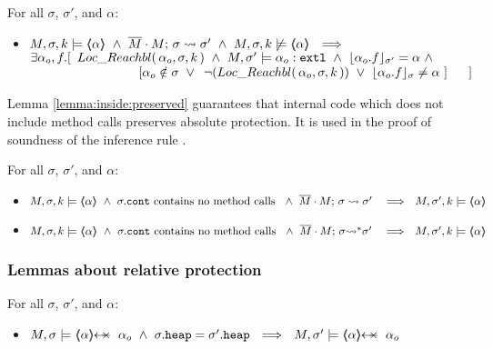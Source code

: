   
 
   {
 \begin{lemma} For all $\sigma$, $\sigma'$, and $\alpha$:
 \label{lemma:notInside:implies}
\begin{itemize}
\item
$ \satDAssertFrom M  {\sigma} k   {\inside{\alpha}}  \ \wedge \ \leadstoBounded  {\Mtwo\cdot M}  {\sigma}  {\sigma'}\ \wedge \  \notSatDAssertFrom M  {\sigma} k   {\inside{\alpha}}
 \ \ \Longrightarrow\ \ $\\
 $\exists \alpha_o,f.[\  \LRelevantK {\alpha_o} {\sigma} {k} \ \wedge \ M, \sigma' \models \external {\alpha_o} \ \wedge \ \interpret {\sigma'} {\alpha_o.f} = \alpha\  \wedge$\\
$\strut \hspace{3cm} [ \alpha_o \notin \sigma\ \vee\ \NotLRelevantK {\alpha_o} {\sigma} {k}\ \vee\  \interpret {\sigma} {\alpha_o.f} \neq \alpha\ ]\ \ \ \ \ ] $
\end{itemize}
\end{lemma}
}

Lemma \ref{lemma:inside:preserved}  guarantees that internal code which does not include method calls preserves absolute protection. 
It is used in the proof of soundness of the inference rule {}.

  {
 \begin{lemma} For all $\sigma$, $\sigma'$, and $\alpha$:
 \label{lemma:inside:preserved} 
\begin{itemize}
\item
$ \satDAssertFrom M  {\sigma} k   {\inside{\alpha}}  \ \wedge \ \sigma.\prg{cont} \mbox{ contains no method calls } \ \wedge\ \leadstoBounded   {\Mtwo\cdot M}  {\sigma}  {\sigma'}\  \ \ \Longrightarrow\ \ \satDAssertFrom M  {\sigma'} k   {\inside{\alpha}}$
\item
$ \satDAssertFrom M  {\sigma} k   {\inside{\alpha}}  \ \wedge \ \sigma.\prg{cont}  \mbox{ contains no method calls } \ \wedge\ \leadstoBoundedStar  {\Mtwo\cdot M}  {\sigma}  {\sigma'}\  \ \ \Longrightarrow\ \ \satDAssertFrom M  {\sigma'} k   {\inside{\alpha}}$
\end{itemize}
\end{lemma}
}

\subsubsection{Lemmas about relative protection}


  {
 \begin{lemma} For all $\sigma$, $\sigma'$, and $\alpha$:
\begin{itemize}
\item
$  M, \sigma  \models    { \protectedFrom \alpha {\alpha_o}}  \ \wedge\   \sigma.\prg{heap}= \sigma'.\prg{heap} \ \ \Longrightarrow\ \  M, \sigma' \models      { \protectedFrom \alpha {\alpha_o}} $
\end{itemize}
\end{lemma}
}

